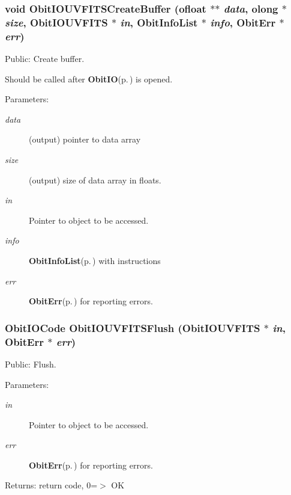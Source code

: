 \subsubsection{\setlength{\rightskip}{0pt plus 5cm}void Obit\-IOUVFITSCreate\-Buffer ({\bf ofloat} $\ast$$\ast$ {\em data}, {\bf olong} $\ast$ {\em size}, {\bf Obit\-IOUVFITS} $\ast$ {\em in}, {\bf Obit\-Info\-List} $\ast$ {\em info}, {\bf Obit\-Err} $\ast$ {\em err})}\label{ObitIOUVFITS_8h_a23}


Public: Create buffer. 

Should be called after {\bf Obit\-IO}{\rm (p.\,\pageref{structObitIO})} is opened. \begin{Desc}
\item[Parameters:]
\begin{description}
\item[{\em data}](output) pointer to data array \item[{\em size}](output) size of data array in floats. \item[{\em in}]Pointer to object to be accessed. \item[{\em info}]{\bf Obit\-Info\-List}{\rm (p.\,\pageref{structObitInfoList})} with instructions \item[{\em err}]{\bf Obit\-Err}{\rm (p.\,\pageref{structObitErr})} for reporting errors. \end{description}
\end{Desc}
\subsubsection{\setlength{\rightskip}{0pt plus 5cm}Obit\-IOCode Obit\-IOUVFITSFlush ({\bf Obit\-IOUVFITS} $\ast$ {\em in}, {\bf Obit\-Err} $\ast$ {\em err})}\label{ObitIOUVFITS_8h_a20}


Public: Flush. 

\begin{Desc}
\item[Parameters:]
\begin{description}
\item[{\em in}]Pointer to object to be accessed. \item[{\em err}]{\bf Obit\-Err}{\rm (p.\,\pageref{structObitErr})} for reporting errors. \end{description}
\end{Desc}
\begin{Desc}
\item[Returns:]return code, 0=$>$ OK \end{Desc}
